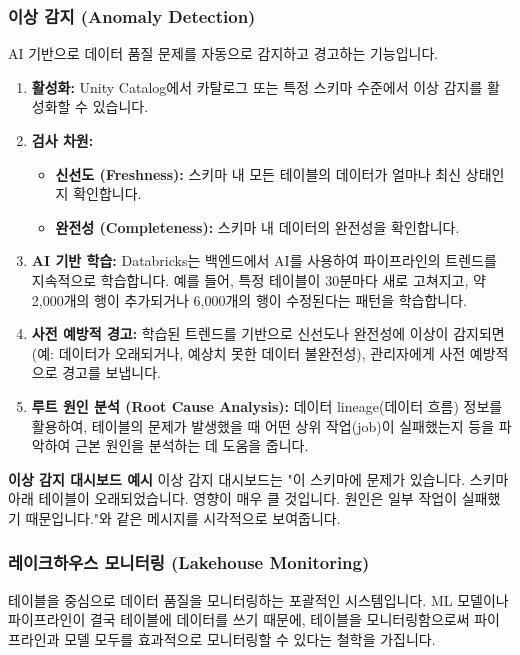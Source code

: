\documentclass[11pt,a4paper]{article}
\begin{document}
\subsubsection{이상 감지 (Anomaly Detection)}
AI 기반으로 데이터 품질 문제를 자동으로 감지하고 경고하는 기능입니다.

\begin{enumerate}
    \item \textbf{활성화:}
    Unity Catalog에서 카탈로그 또는 특정 스키마 수준에서 이상 감지를 활성화할 수 있습니다.

    \item \textbf{검사 차원:}
    \begin{itemize}
        \item \textbf{신선도 (Freshness):} 스키마 내 모든 테이블의 데이터가 얼마나 최신 상태인지 확인합니다.
        \item \textbf{완전성 (Completeness):} 스키마 내 데이터의 완전성을 확인합니다.
    \end{itemize}

    \item \textbf{AI 기반 학습:}
    Databricks는 백엔드에서 AI를 사용하여 파이프라인의 트렌드를 지속적으로 학습합니다. 예를 들어, 특정 테이블이 30분마다 새로 고쳐지고, 약 2,000개의 행이 추가되거나 6,000개의 행이 수정된다는 패턴을 학습합니다.

    \item \textbf{사전 예방적 경고:}
    학습된 트렌드를 기반으로 신선도나 완전성에 이상이 감지되면(예: 데이터가 오래되거나, 예상치 못한 데이터 불완전성), 관리자에게 사전 예방적으로 경고를 보냅니다.

    \item \textbf{루트 원인 분석 (Root Cause Analysis):}
    데이터 lineage(데이터 흐름) 정보를 활용하여, 테이블의 문제가 발생했을 때 어떤 상위 작업(job)이 실패했는지 등을 파악하여 근본 원인을 분석하는 데 도움을 줍니다.
\end{enumerate}

\begin{examplebox}
\textbf{이상 감지 대시보드 예시}
이상 감지 대시보드는 "이 스키마에 문제가 있습니다. 스키마 아래 테이블이 오래되었습니다. 영향이 매우 클 것입니다. 원인은 일부 작업이 실패했기 때문입니다."와 같은 메시지를 시각적으로 보여줍니다.
\end{examplebox}

\subsubsection{레이크하우스 모니터링 (Lakehouse Monitoring)}
테이블을 중심으로 데이터 품질을 모니터링하는 포괄적인 시스템입니다. ML 모델이나 파이프라인이 결국 테이블에 데이터를 쓰기 때문에, 테이블을 모니터링함으로써 파이프라인과 모델 모두를 효과적으로 모니터링할 수 있다는 철학을 가집니다.
\end{document}

